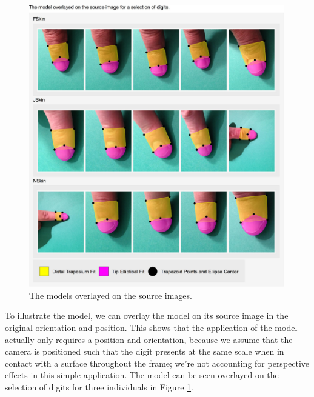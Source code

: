 \begin{figure}[h!]
  \centering
    \includegraphics[width=0.99\textwidth]{Chapter4/Figs/Model_Overlayed.jpg}
    \caption{The models overlayed on the source images.}\label{fig:FingertipModelResult}
\end{figure}

To illustrate the model, we can overlay the model on its source image in the original orientation and position. This shows that the application of the model actually only requires a position and orientation, because we assume that the camera is positioned such that the digit presents at the same scale when in contact with a surface throughout the frame; we're not accounting for perspective effects in this simple application.
The model can be seen overlayed on the selection of digits for three individuals in Figure \ref{fig:FingertipModelResult}.



